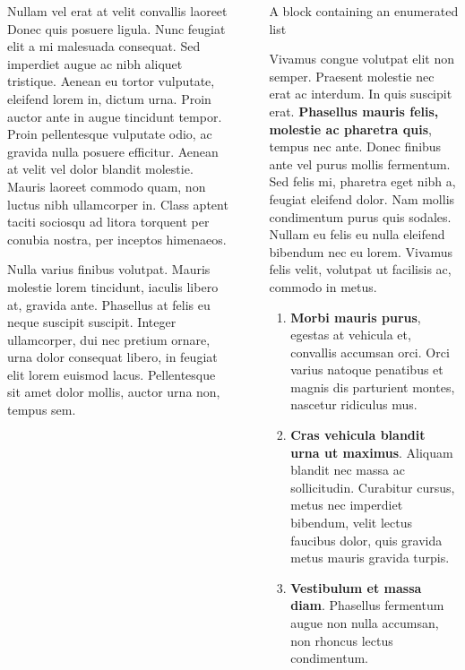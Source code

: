 \documentclass[final]{beamer}
\newlength{\sepwidth}
\newlength{\colwidth}
\newcommand{\separatorcolumn}{\begin{column}{\sepwidth}\end{column}}
\begin{document}
\begin{frame}[t]
\begin{columns}[t]
\begin{column}{\colwidth}
\begin{block}{Nullam vel erat at velit convallis laoreet}
    Donec quis posuere ligula. Nunc feugiat elit a mi malesuada consequat. Sed
    imperdiet augue ac nibh aliquet tristique. Aenean eu tortor vulputate,
    eleifend lorem in, dictum urna. Proin auctor ante in augue tincidunt
    tempor. Proin pellentesque vulputate odio, ac gravida nulla posuere
    efficitur. Aenean at velit vel dolor blandit molestie. Mauris laoreet
    commodo quam, non luctus nibh ullamcorper in. Class aptent taciti sociosqu
    ad litora torquent per conubia nostra, per inceptos himenaeos.

    Nulla varius finibus volutpat. Mauris molestie lorem tincidunt, iaculis
    libero at, gravida ante. Phasellus at felis eu neque suscipit suscipit.
    Integer ullamcorper, dui nec pretium ornare, urna dolor consequat libero,
    in feugiat elit lorem euismod lacus. Pellentesque sit amet dolor mollis,
    auctor urna non, tempus sem.

  \end{block}

\end{column}

\separatorcolumn

\begin{column}{\colwidth}

  \begin{block}{A block containing an enumerated list}

    Vivamus congue volutpat elit non semper. Praesent molestie nec erat ac
    interdum. In quis suscipit erat. \textbf{Phasellus mauris felis, molestie
    ac pharetra quis}, tempus nec ante. Donec finibus ante vel purus mollis
    fermentum. Sed felis mi, pharetra eget nibh a, feugiat eleifend dolor. Nam
    mollis condimentum purus quis sodales. Nullam eu felis eu nulla eleifend
    bibendum nec eu lorem. Vivamus felis velit, volutpat ut facilisis ac,
    commodo in metus.

    \begin{enumerate}
      \item \textbf{Morbi mauris purus}, egestas at vehicula et, convallis
        accumsan orci. Orci varius natoque penatibus et magnis dis parturient
        montes, nascetur ridiculus mus.
      \item \textbf{Cras vehicula blandit urna ut maximus}. Aliquam blandit nec
        massa ac sollicitudin. Curabitur cursus, metus nec imperdiet bibendum,
        velit lectus faucibus dolor, quis gravida metus mauris gravida turpis.
      \item \textbf{Vestibulum et massa diam}. Phasellus fermentum augue non
        nulla accumsan, non rhoncus lectus condimentum.
    \end{enumerate}


\end{block}
\end{column}
\end{columns}
\end{frame}
\end{document}

